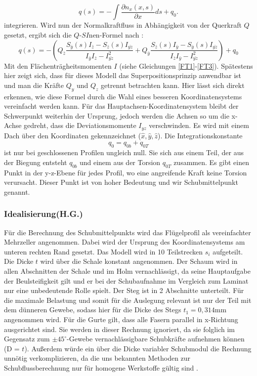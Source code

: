 \begin{equation}
	q(s)=-\int\frac{\partial n_x(x,s)}{\partial x}ds+q_0.
\end{equation}
integrieren. Wird nun der Normalkraftfluss in Abhängigkeit von der Querkraft $Q$ gesetzt, ergibt sich die $Q$-$SI$nen-Formel nach \cite{item15}:
\begin{equation}\label{qs}
	q(s)=-(Q_{\bar{z}}\frac{S_{\bar{y}}(s)I_{\bar{z}}-S_{\bar{z}}(s)I_{\bar{yz}}}{I_{\bar{y}}I_{\bar{z}}-I_{\bar{yz}}^2}+Q_{\bar{y}}\frac{S_{\bar{z}}(s)I_{\bar{y}}-S_{\bar{y}}(s)I_{\bar{yz}}}{I_{\bar{z}}I_{\bar{y}}-I_{\bar{yz}}^2})+q_0
\end{equation}
Mit den Flächenträgheitsmomenten $I$ (siehe Gleichungen \ref{FT1}-\ref{FT3}). Spätestens hier zeigt sich, dass für dieses Modell das Superpositionsprinzip anwendbar ist und man die Kräfte $Q_y$ und $Q_z$ getrennt betrachten kann.
Hier lässt sich direkt erkennen, wie diese Formel durch die Wahl eines besseren Koordinatensystems vereinfacht werden kann. Für das Hauptachsen-Koordinatensystem bleibt der Schwerpunkt weiterhin der Ursprung, jedoch werden die Achsen so um die x-Achse gedreht, dass die Deviationsmomente $I_{yz}$ verschwinden. Es wird mit einem Dach über den Koordinaten gekennzeichnet ($\hat{x},\hat{y},\hat{z}$). Die Integrationskonstante
\begin{equation}
	q_{0} = q_{0b}+q_{0T}
\end{equation}
ist nur bei geschlossenen Profilen ungleich null. Sie sich aus einem Teil, der aus der Biegung entsteht $q_{0b}$ und einem aus der Torsion $q_{0T}$ zusammen. Es gibt einen Punkt in der y-z-Ebene für jedes Profil, wo eine angreifende Kraft keine Torsion verursacht. Dieser Punkt ist von hoher Bedeutung und wir Schubmittelpunkt genannt.
\subsubsection{Idealisierung(H.G.)}
Für die Berechnung des Schubmittelpunkts wird das Flügelprofil als vereinfachter Mehrzeller angenommen.
Dabei wird der Ursprung des Koordinatensystems am unteren rechten Rand gesetzt. Das Modell wird in 10 Teilstrecken $s_{i}$ aufgeteilt. Die Dicke $t$ wird über die Schale konstant angenommen. Der Schaum wird in allen Abschnitten der Schale und im Holm vernachlässigt, da seine Hauptaufgabe der Beulsteifigkeit gilt und er bei der Schubaufnahme im Vergleich zum Laminat nur eine unbedeutende Rolle spielt. Der Steg ist in 2 Abschnitte unterteilt. Für die maximale Belastung und somit für die Auslegung relevant ist nur der Teil mit dem dünneren Gewebe, sodass hier für die Dicke des Stegs $t_{1}=0,314\mathrm{mm}$ angenommen wird. Für die Gurte gilt, dass alle Fasern parallel in x-Richtung ausgerichtet sind. Sie werden in dieser Rechnung ignoriert, da sie folglich im Gegensatz zum $\pm45^\circ$-Gewebe vernachlässigbare Schubkräfte aufnehmen können (D = $t$). Außerdem würde ein über die Dicke variabler Schubmodul die Rechnung unnötig verkomplizieren, da die uns bekannten Methoden zur Schubflussberechnung nur für homogene Werkstoffe gültig sind \cite{item15}.

